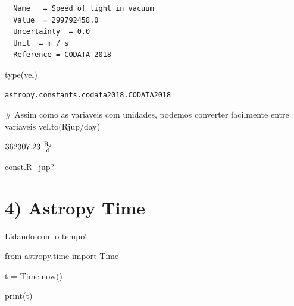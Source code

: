 \documentclass[
  letterpaper,
  DIV=11,
  numbers=noendperiod]{scrreprt}
\newenvironment{Shaded}{\begin{snugshade}}{\end{snugshade}}
\newcommand{\BuiltInTok}[1]{\textcolor[rgb]{0.00,0.23,0.31}{#1}}
\newcommand{\CommentTok}[1]{\textcolor[rgb]{0.37,0.37,0.37}{#1}}
\newcommand{\ImportTok}[1]{\textcolor[rgb]{0.00,0.46,0.62}{#1}}
\newcommand{\NormalTok}[1]{\textcolor[rgb]{0.00,0.23,0.31}{#1}}
\newcommand{\OperatorTok}[1]{\textcolor[rgb]{0.37,0.37,0.37}{#1}}
\newcommand{\StringTok}[1]{\textcolor[rgb]{0.13,0.47,0.30}{#1}}
\begin{document}
\begin{verbatim}
  Name   = Speed of light in vacuum
  Value  = 299792458.0
  Uncertainty  = 0.0
  Unit  = m / s
  Reference = CODATA 2018
\end{verbatim}

\begin{Shaded}
\begin{Highlighting}[]
\BuiltInTok{type}\NormalTok{(vel)}
\end{Highlighting}
\end{Shaded}

\begin{verbatim}
astropy.constants.codata2018.CODATA2018
\end{verbatim}

\begin{Shaded}
\begin{Highlighting}[]
\CommentTok{\# Assim como as variaveis com unidades, podemos converter facilmente entre variaveis}
\NormalTok{vel.to(}\StringTok{\textquotesingle{}Rjup/day\textquotesingle{}}\NormalTok{)}
\end{Highlighting}
\end{Shaded}

$362307.23 \; \mathrm{\frac{R_{\rm J}}{d}}$

\begin{Shaded}
\begin{Highlighting}[]
\NormalTok{const.R\_jup?}
\end{Highlighting}
\end{Shaded}

\section{4) Astropy Time}\label{astropy-time}

Lidando com o tempo!

\begin{Shaded}
\begin{Highlighting}[]
\ImportTok{from}\NormalTok{ astropy.time }\ImportTok{import}\NormalTok{ Time}
\end{Highlighting}
\end{Shaded}

\begin{Shaded}
\begin{Highlighting}[]
\NormalTok{t }\OperatorTok{=}\NormalTok{ Time.now()}
\end{Highlighting}
\end{Shaded}

\begin{Shaded}
\begin{Highlighting}[]
\BuiltInTok{print}\NormalTok{(t)}
\end{Highlighting}
\end{Shaded}
\end{document}
